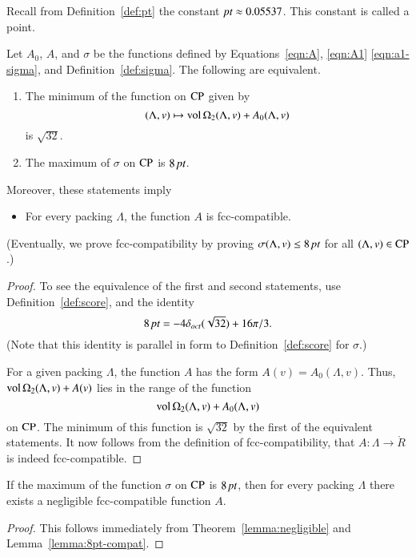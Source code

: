 Recall from Definition~\ref{def:pt} the constant $\hbox{\it pt}\approx
0.05537$.  This constant is called a point.

\begin{lemma}\label{lemma:8pt-compat}
Let $A_0$, $A$, and $\sigma$ be the functions defined by
Equations~\ref{eqn:A}, \ref{eqn:A1}  \ref{eqn:a1-sigma}, and
Definition~\ref{def:sigma}. The following are equivalent.
\begin{enumerate}
  \item The minimum of the function on ${\operatorname{CP}}$ given by
      $$(\Lambda,v)\mapsto {\operatorname{vol}}\,\Omega_2(\Lambda,v) + A_0(\Lambda,v)$$
is $\sqrt{32}$.
  \item The maximum of $\sigma$ on ${\operatorname{CP}}$ is $8\,\hbox{\it pt}$.
\end{enumerate}
Moreover, these statements imply
\begin{itemize}
  \item For every packing $\Lambda$,
  the function $A$ is
  fcc-compatible.
\end{itemize}
\end{lemma}

(Eventually, we prove fcc-compatibility by proving
$\sigma(\Lambda,v)\le8\,\hbox{\it pt}$ for all $(\Lambda,v)\in{\operatorname{CP}}$.)

\begin{proof} To see the equivalence of the first and second statements,
use Definition~\ref{def:score},  and the identity
   $$8\,\hbox{\it pt} = -4\delta_{oct} (\sqrt{32}) + 16 \pi/3.$$
(Note that this identity is parallel in form to
Definition~\ref{def:score} for $\sigma$.)

For a given packing $\Lambda$, the function $A$ has the
form $A(v) = A_0(\Lambda,v)$.    Thus,
${\operatorname{vol}}\,\Omega_2(\Lambda,v)+A(v)$ lies in the range of the function
   $${\operatorname{vol}}\,\Omega_2(\Lambda,v) + A_0(\Lambda,v)$$
on ${\operatorname{CP}}$.  The minimum of this function is $\sqrt{32}$ by the
first of the equivalent statements.  It now follows from the
definition of fcc-compatibility, that $A:\Lambda\to\ring{R}$ is
indeed fcc-compatible.
\end{proof}

\begin{theorem}\label{lemma:exista}
If the maximum of the function $\sigma$ on
${\operatorname{CP}}$ is $8\,\hbox{\it pt}$, then for every packing $\Lambda$
there exists a negligible fcc-compatible function $A$.
\end{theorem}

\begin{proof} This follows immediately from Theorem~\ref{lemma:negligible}
and Lemma~\ref{lemma:8pt-compat}.
\end{proof}

